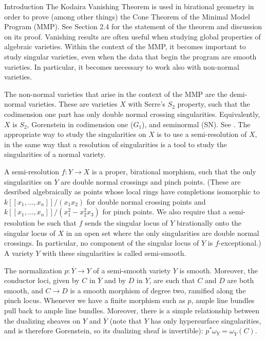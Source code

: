 \documentclass{article}
\begin{document}
\newpage
\tableofcontents
\addcontentsline{}{}{}
\newpage
\begin{section}{Introduction}  The Kodaira Vanishing Theorem is used in birational geometry in order to prove (among other things) the Cone Theorem of the Minimal Model Program (MMP).  See \cite{KM98} Section 2.4 for the statement of the theorem and discussion on its proof.   Vanishing results are often useful when studying global properties of algebraic varieties.  Within the context of the MMP, it becomes important to study singular varieties, even when the data that begin the program are smooth varieties.  In particular, it becomes necessary to work also with non-normal varieties. 

The non-normal varieties that arise in the context of the MMP are the demi-normal varieties.  These are varieties $X$ with Serre's $S_2$ property, such that the codimension one part has only double normal crossing singularities.  Equivalently, $X$ is $S_2$, Gorenstein in codimension one ($G_1$), and seminormal (SN).  See \cite{GT80}.  The appropriate way to study the singularities on $X$ is to use a semi-resolution of $X$, in the same way that a resolution of singularities is a tool to study the singularities of a normal variety.  

A semi-resolution $f: Y \rightarrow X$ is a proper, birational morphism, such that the only singularities on $Y$ are double normal crossings and pinch points.  (These are desribed algebraically as points whose local rings have completions isomorphic to $k[[x_1, \ldots, x_n]]/(x_1x_2)$ for double normal crossing points and $k[[x_1, \ldots, x_n]]/(x_1^2 - x_2^2x_3)$ for pinch points.  We also require that a semi-resolution be such that $f$ sends the singular locus of $Y$ birationally onto the singular locus of $X$ in an open set where the only singularities are double normal crossings.  In particular, no component of the singular locus of $Y$ is $f$-exceptional.)  A variety $Y$ with these singularities is called semi-smooth.

The normalization $p:  \overline{Y} \rightarrow Y$ of a semi-smooth variety $Y$ is smooth.  Moreover, the conductor loci, given by $C$ in $\overline{Y}$ and by $D$ in $Y$, are such that $C$ and $D$ are both smooth, and $C \rightarrow D$ is a smooth morphism of degree two, ramified along the pinch locus.  Whenever we have a finite morphism such as $p$, ample line bundles pull back to ample line bundles.  Moreover, there is a simple relationship between the dualizing sheaves on $Y$ and $\overline{Y}$ (note that $Y$ has only hypersurface singularities, and is therefore Gorenstein, so its dualizing sheaf is invertible):  $p^*\omega_Y = \omega_{\overline{Y}}(C).$


\end{section}
\end{document}
